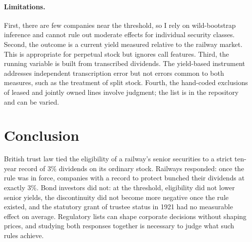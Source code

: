 \documentclass[11pt]{article}
\begin{document}
\paragraph{Limitations.} First, there are few companies near the threshold, so I rely on wild-bootstrap inference and cannot rule out moderate effects for individual security classes. Second, the outcome is a current yield measured relative to the railway market. This is appropriate for perpetual stock but ignores call features. Third, the running variable is built from transcribed dividends. The yield-based instrument addresses independent transcription error but not errors common to both measures, such as the treatment of split stock. Fourth, the hand-coded exclusions of leased and jointly owned lines involve judgment; the list is in the repository and can be varied.

\section{Conclusion}\label{sec:conclusion}

British trust law tied the eligibility of a railway's senior securities to a strict ten-year record of 3\% dividends on its ordinary stock. Railways responded: once the rule was in force, companies with a record to protect bunched their dividends at exactly 3\%. Bond investors did not: at the threshold, eligibility did not lower senior yields, the discontinuity did not become more negative once the rule existed, and the statutory grant of trustee status in 1921 had no measurable effect on average. Regulatory lists can shape corporate decisions without shaping prices, and studying both responses together is necessary to judge what such rules achieve.
\end{document}
